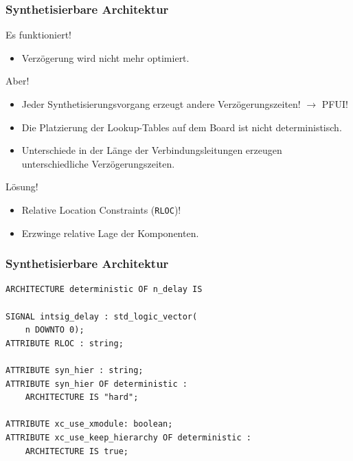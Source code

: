 \documentclass{beamer}
\begin{document}
\begin{frame}[fragile]
    \frametitle{Synthetisierbare Architektur}
    Es funktioniert!
    \begin{itemize}
        \item Verzögerung wird nicht mehr optimiert.
    \end{itemize}
    Aber!
    \begin{itemize}
        \item Jeder Synthetisierungsvorgang erzeugt andere Verzögerungszeiten! $\rightarrow$ PFUI!
        \item Die Platzierung der Lookup-Tables auf dem Board ist nicht deterministisch.
        \item Unterschiede in der Länge der Verbindungsleitungen erzeugen unterschiedliche Verzögerungszeiten.
    \end{itemize}
    Lösung!
    \begin{itemize}
        \item Relative Location Constraints (\texttt{RLOC})!
        \item Erzwinge relative Lage der Komponenten.
    \end{itemize}
\end{frame}





    \begin{frame}[fragile]
        \frametitle{Synthetisierbare Architektur}
        \begin{lstlisting}[style=vhdl]
ARCHITECTURE deterministic OF n_delay IS

SIGNAL intsig_delay : std_logic_vector(
    n DOWNTO 0);
ATTRIBUTE RLOC : string;

ATTRIBUTE syn_hier : string;
ATTRIBUTE syn_hier OF deterministic : 
    ARCHITECTURE IS "hard";

ATTRIBUTE xc_use_xmodule: boolean;
ATTRIBUTE xc_use_keep_hierarchy OF deterministic : 
    ARCHITECTURE IS true;

\end{lstlisting}
\end{frame}
\end{document}
